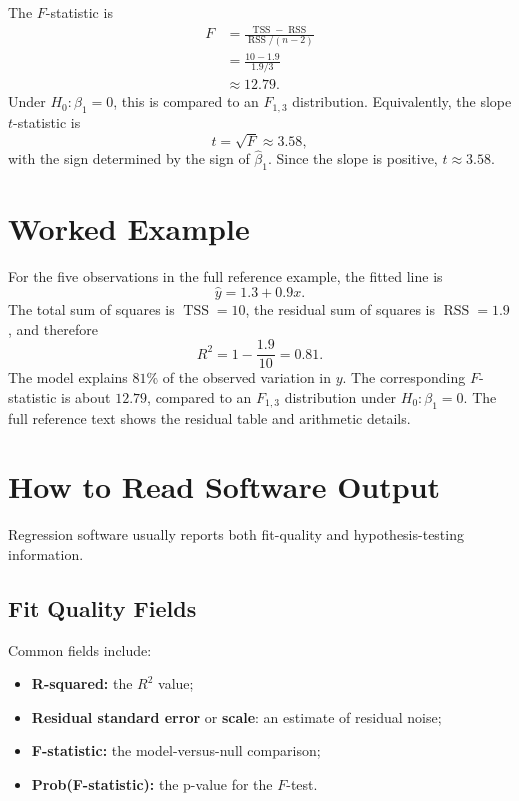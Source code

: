 {The $F$-statistic is
\begin{align}
  F
  &=\frac{\operatorname{TSS}-\operatorname{RSS}}{\operatorname{RSS}/(n-2)} \\
  &=\frac{10-1.9}{1.9/3} \\
  &\approx 12.79.
\end{align}
Under $H_0:\beta_1=0$, this is compared to an $F_{1,3}$ distribution.  Equivalently, the slope $t$-statistic is
\begin{equation}
  t=\sqrt{F}\approx 3.58,
\end{equation}
with the sign determined by the sign of $\widehat{\beta}_1$.  Since the slope is positive, $t\approx 3.58$.
}{
\section{Worked Example}

For the five observations in the full reference example, the fitted line is
\begin{equation}
  \widehat{y}=1.3+0.9x.
\end{equation}
The total sum of squares is \(\operatorname{TSS}=10\), the residual sum of squares is \(\operatorname{RSS}=1.9\), and therefore
\begin{equation}
  R^2=1-\frac{1.9}{10}=0.81.
\end{equation}
The model explains \(81\%\) of the observed variation in \(y\).  The corresponding $F$-statistic is about \(12.79\), compared to an \(F_{1,3}\) distribution under \(H_0:\beta_1=0\).  The full reference text shows the residual table and arithmetic details.
}
\section{How to Read Software Output}

Regression software usually reports both fit-quality and hypothesis-testing information.

\subsection{Fit Quality Fields}

Common fields include:
\begin{itemize}
  \item \textbf{R-squared:} the $R^2$ value;
  \item \textbf{Residual standard error} or \textbf{scale}: an estimate of residual noise;
  \item \textbf{F-statistic:} the model-versus-null comparison;
  \item \textbf{Prob(F-statistic):} the p-value for the $F$-test.
\end{itemize}

